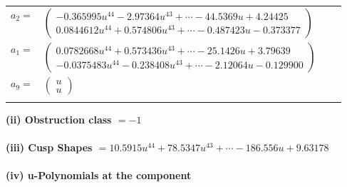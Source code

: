 \documentclass[1p]{elsarticle_modified}
\theoremstyle{definition}
\begin{document}
\begin{tabular}{m{7pt} m{180pt} m{7pt} m{180pt} }
\flushright $a_{2}=$&$\begin{pmatrix}-0.365995 u^{44}-2.97364 u^{43}+\cdots-44.5369 u+4.24425\\0.0844612 u^{44}+0.574806 u^{43}+\cdots-0.487423 u-0.373377\end{pmatrix}$ \\
\flushright $a_{1}=$&$\begin{pmatrix}0.0782668 u^{44}+0.573436 u^{43}+\cdots-25.1426 u+3.79639\\-0.0375483 u^{44}-0.238408 u^{43}+\cdots-2.12064 u-0.129900\end{pmatrix}$ \\
\flushright $a_{9}=$&$\begin{pmatrix}u\\u\end{pmatrix}$\\&\end{tabular}
\flushleft \textbf{(ii) Obstruction class $= -1$}\\~\\
\flushleft \textbf{(iii) Cusp Shapes $= 10.5915 u^{44}+78.5347 u^{43}+\cdots-186.556 u+9.63178$}\\~\\
\newpage\renewcommand{\arraystretch}{1}
\flushleft \textbf{(iv) u-Polynomials at the component}\newline \\
\end{document}
